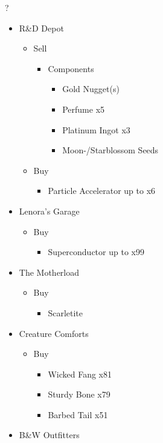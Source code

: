 \begin{shop}{?}
	\begin{itemize}
		\item R\&D Depot
			\begin{itemize}
				\item Sell
					\begin{itemize}
						\item Components
							\begin{itemize}
								\item Gold Nugget(s)
								\item Perfume x5
								\item Platinum Ingot x3
								\item Moon-/Starblossom Seeds
							\end{itemize}
					\end{itemize}
				\item Buy
					\begin{itemize}
						\item Particle Accelerator up to x6
					\end{itemize}
			\end{itemize}
		\item Lenora's Garage
			\begin{itemize}
				\item Buy
					\begin{itemize}
						\item Superconductor up to x99
					\end{itemize}
			\end{itemize}
		\item The Motherload
			\begin{itemize}
				\item Buy
					\begin{itemize}
						\item Scarletite
					\end{itemize}
			\end{itemize}
		\item Creature Comforts
			\begin{itemize}
				\item Buy
					\begin{itemize}
						\item Wicked Fang x81
						\item Sturdy Bone x79
						\item Barbed Tail x51
					\end{itemize}
			\end{itemize}
		\item B\&W Outfitters

\end{itemize}
\end{shop}
